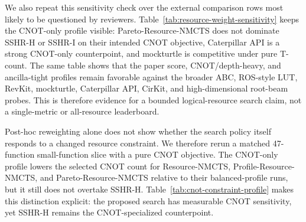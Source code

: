 \documentclass[11pt]{article}
\newcommand{\method}{Resource-NMCTS}
\begin{document}
\begin{table}[H]
\centering
\scriptsize
\setlength{\tabcolsep}{3pt}
\renewcommand{\arraystretch}{1.08}
\caption{Post-hoc robustness to alternative logical-resource weights.  Each
cell reports score win/loss/tie counts and mean relative score change; negative
values favor \method{} or Pareto-\method{}.}
\label{tab:weight-robustness}

\end{table}

We also repeat this sensitivity check over the external comparison rows most
likely to be questioned by reviewers.  Table~\ref{tab:resource-weight-sensitivity}
keeps the CNOT-only profile visible: Pareto-\method{} does not dominate
SSHR-H or SSHR-I on their intended CNOT objective, Caterpillar API is a strong
CNOT-only counterpoint, and mockturtle is competitive under pure T-count.  The
same table shows that the paper score, CNOT/depth-heavy, and ancilla-tight
profiles remain favorable against the broader ABC, ROS-style LUT, RevKit,
mockturtle, Caterpillar API, CirKit, and high-dimensional root-beam probes.
This is therefore evidence for a bounded logical-resource search claim, not a
single-metric or all-resource leaderboard.

\begin{table}[H]
\centering
\scriptsize
\setlength{\tabcolsep}{2.5pt}
\renewcommand{\arraystretch}{1.08}
\caption{Resource-weight sensitivity over internal and external baselines.
Each cell reports score win/loss/tie counts and mean relative score change
after recomputing the matched rows under the listed logical-resource profile;
negative values favor \method{} or Pareto-\method{}.}
\label{tab:resource-weight-sensitivity}

\end{table}

Post-hoc reweighting alone does not show whether the search policy itself
responds to a changed resource constraint.  We therefore rerun a matched
47-function small-function slice with a pure CNOT objective.  The CNOT-only
profile lowers the selected CNOT count for \method{}, Profile-\method{}, and
Pareto-\method{} relative to their balanced-profile runs, but it still does
not overtake SSHR-H.  Table~\ref{tab:cnot-constraint-profile} makes this
distinction explicit: the proposed search has measurable CNOT sensitivity, yet
SSHR-H remains the CNOT-specialized counterpoint.

\begin{table}[H]
\centering
\scriptsize
\setlength{\tabcolsep}{3pt}
\renewcommand{\arraystretch}{1.08}
\caption{CNOT-only resource-profile rerun on 47 matched small functions.  The
profile changes the search objective before synthesis rather than only
recomputing scores afterward.  $\Delta$ reports the same-method mean CNOT
change relative to the balanced-profile run; negative values mean the CNOT-only
rerun selected lower-CNOT circuits.}
\label{tab:cnot-constraint-profile}

\end{table}
\end{document}
